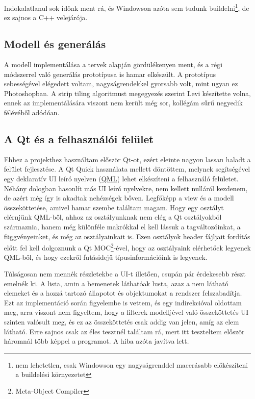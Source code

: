 Indokalatlanul sok időnk ment rá, és Windowson azóta sem tudunk buildelni\footnote{nem lehetetlen, csak Windowson egy nagyságrenddel macerásabb előkészíteni a buildelési környezetet}, de ez sajnos a C++ velejárója.

\subsection{Modell és generálás}

A modell implementálása a tervek alapján gördülékenyen ment, és a régi módszerrel való generálás prototípusa is hamar elkészült. A prototípus sebességével elégedett voltam, nagyságrendekkel gyorsabb volt, mint ugyan ez Photoshopban. A strip tiling algoritmust megegyezés szerint Levi készítette volna, ennek az implementálására viszont nem került még sor, kollégám sűrű negyedik félévéből adódóan.

\subsection{A Qt és a felhasználói felület}

Ehhez a projekthez használtam először Qt-ot, ezért eleinte nagyon lassan haladt a felület fejlesztése. A Qt Quick használata mellett döntöttem, melynek segítségével egy deklaratív UI leíró nyelven (\href{https://en.wikipedia.org/wiki/QML}{QML}) lehet elkészíteni a felhasználó felületet. Néhány dologban hasonlít más UI leíró nyelvekre, nem kellett nulláról kezdenem, de azért még így is akadtak nehézségek bőven. Legfőképp a view és a modell összeköttetése, amivel hamar szembe találtam magam. Hogy egy osztályt elérnjünk QML-ből, ahhoz az osztályunknak nem elég a Qt osztályokból származnia, hanem még különféle makrókkal el kell lássuk a tagváltozóinkat, a függvényeinket, és még az osztályainkait is. Ezen osztályok header fájljait fordítás előtt fel kell dolgoznunk a Qt MOC\footnote{Meta-Object Compiler}-ével, hogy az osztályaink elérhetőek legyenek QML-ből, és hogy ezekről futásidejű típusinformációink is legyenek. 

Túlságosan nem mennék részletekbe a UI-t illetően, csupán pár érdekesebb részt emelnék ki. A lista, amin a bemenetek láthatóak lusta, azaz a nem látható elemeket és a hozzá tartozó állapotot és objektumokat a rendszer felszabadítja. Ezt az implementáció során figyelembe is vettem, és egy indirekcióval oldottam meg, arra viszont nem figyeltem, hogy a filterek modelljével való összeköttetés UI szinten valósult meg, és ez az összeköttetés csak addig van jelen, amíg az elem látható. Erre sajnos csak az éles tesztnél találtam rá, mert itt teszteltem először háromnál több képpel a programot. A hiba azóta javítva lett.

